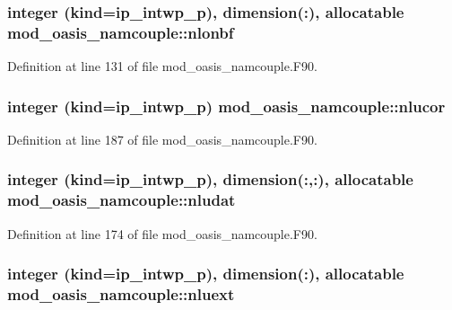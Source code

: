 \hypertarget{classmod__oasis__namcouple_a6e774d31f16b513b1d604e72a82dff40}{
\subsubsection[{nlonbf}]{\setlength{\rightskip}{0pt plus 5cm}integer (kind=ip\+\_\+intwp\+\_\+p), dimension(\+:), allocatable mod\+\_\+oasis\+\_\+namcouple\+::nlonbf\hspace{0.3cm}{\ttfamily [private]}}}\label{classmod__oasis__namcouple_a6e774d31f16b513b1d604e72a82dff40}


Definition at line 131 of file mod\+\_\+oasis\+\_\+namcouple.\+F90.

\hypertarget{classmod__oasis__namcouple_aee9f6849ec644ee40f465976bc6c7b96}{
\subsubsection[{nlucor}]{\setlength{\rightskip}{0pt plus 5cm}integer (kind=ip\+\_\+intwp\+\_\+p) mod\+\_\+oasis\+\_\+namcouple\+::nlucor\hspace{0.3cm}{\ttfamily [private]}}}\label{classmod__oasis__namcouple_aee9f6849ec644ee40f465976bc6c7b96}


Definition at line 187 of file mod\+\_\+oasis\+\_\+namcouple.\+F90.

\hypertarget{classmod__oasis__namcouple_abb7c2cd3a371bbb8ccd6a272d0e9b60f}{
\subsubsection[{nludat}]{\setlength{\rightskip}{0pt plus 5cm}integer (kind=ip\+\_\+intwp\+\_\+p), dimension(\+:,\+:), allocatable mod\+\_\+oasis\+\_\+namcouple\+::nludat\hspace{0.3cm}{\ttfamily [private]}}}\label{classmod__oasis__namcouple_abb7c2cd3a371bbb8ccd6a272d0e9b60f}


Definition at line 174 of file mod\+\_\+oasis\+\_\+namcouple.\+F90.

\hypertarget{classmod__oasis__namcouple_a7510ecfe3d0f141252450e4ba66209ba}{
\subsubsection[{nluext}]{\setlength{\rightskip}{0pt plus 5cm}integer (kind=ip\+\_\+intwp\+\_\+p), dimension(\+:), allocatable mod\+\_\+oasis\+\_\+namcouple\+::nluext\hspace{0.3cm}{\ttfamily [private]}}}\label{classmod__oasis__namcouple_a7510ecfe3d0f141252450e4ba66209ba}


